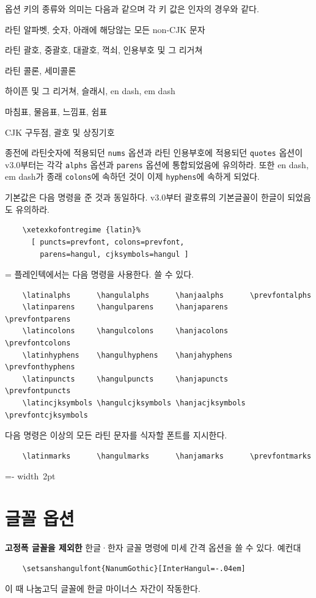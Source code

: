 \documentclass[a4paper]{article}
\def\grayvrule{{\color{white!80!black}\vrule width 2pt}}
\newenvironment{plaintex}
  {\par\medskip
    \setbox0=\vbox\bgroup\kern5pt\leftskip15pt \small
    \parindent0pt }
  {\par \kern5pt\egroup
    \dimen0=\dimexpr\pagegoal-\pagetotal\relax
    \ifdim\dimen0<\baselineskip\relax \dimen0\maxdimen \fi
    \ifdim\ht0<\dimen0
      \hbox{\grayvrule \box0}%
    \else
      \setbox2=\vsplit0 to\dimen0
      \lineskip0pt
      \ifvoid2 \else\hbox{\grayvrule \box2}\fi
      \ifvoid0 \else\hbox{\grayvrule \box0}\fi
    \fi \par\smallskip
  }
\newenvironment{oldstuff}
  {
    \par\smallskip
    \narrower\small\parindent0pt
  }
  {
    \par\smallskip
  }
\def\hemph#1{\textsf{\bfseries #1}}
\begin{document}
옵션 키의 종류와 의미는 다음과 같으며 각 키 값은 인자의 경우와 같다.
\begin{description}\itemsep0pt
\item[alphs] 라틴 알파벳, 숫자, 아래에 해당않는 모든 non-CJK 문자
\item[parens] 라틴 괄호, 중괄호, 대괄호, 꺽쇠, 인용부호 및 그 리거쳐
\item[colons] 라틴 콜론, 세미콜론
\item[hyphens] 하이픈 및 그  리거쳐, 슬래시, en dash, em dash
\item[puncts] 마침표, 물음표, 느낌표, 쉼표
\item[cjksymbols] CJK 구두점, 괄호 및 상징기호
\end{description}

\begin{oldstuff}
종전에
라틴숫자에 적용되던 \verb|nums| 옵션과
라틴 인용부호에 적용되던 \verb|quotes| 옵션이
v3.0부터는
각각 \verb|alphs| 옵션과 \verb|parens| 옵션에 통합되었음에 유의하라.
또한 en dash, em dash가 종래 \verb|colons|에 속하던 것이 이제
\verb|hyphens|에 속하게 되었다.
\end{oldstuff}

기본값은 다음 명령을 준 것과 동일하다.
v3.0부터 괄호류의 기본글꼴이 한글이 되었음도 유의하라.
\begin{verbatim}
    \xetexkofontregime {latin}%
      [ puncts=prevfont, colons=prevfont,
        parens=hangul, cjksymbols=hangul ]
\end{verbatim}
\begin{plaintex}
플레인텍에서는 다음 명령을 사용한다.  쓸 수 있다.
\begin{verbatim}
    \latinalphs      \hangulalphs      \hanjaalphs      \prevfontalphs
    \latinparens     \hangulparens     \hanjaparens     \prevfontparens
    \latincolons     \hangulcolons     \hanjacolons     \prevfontcolons
    \latinhyphens    \hangulhyphens    \hanjahyphens    \prevfonthyphens
    \latinpuncts     \hangulpuncts     \hanjapuncts     \prevfontpuncts
    \latincjksymbols \hangulcjksymbols \hanjacjksymbols \prevfontcjksymbols
\end{verbatim}
다음 명령은 이상의 모든 라틴 문자를 식자할 폰트를 지시한다.
\begin{verbatim}
    \latinmarks      \hangulmarks      \hanjamarks      \prevfontmarks
\end{verbatim}
\end{plaintex}

\section{글꼴 옵션}\label{sec:fontopts}
\hemph{고정폭 글꼴을 제외한} 한글·한자 글꼴 명령에 미세 간격 옵션을
쓸 수 있다. 예컨대
\begin{verbatim}
    \setsanshangulfont{NanumGothic}[InterHangul=-.04em]
\end{verbatim}
이 때 나눔고딕 글꼴에 한글 마이너스 자간이 작동한다.
\end{document}
